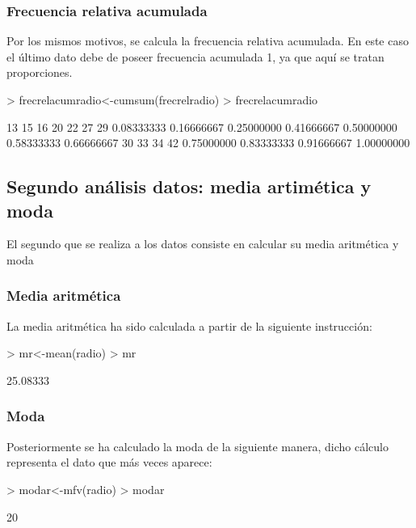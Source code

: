 \documentclass [a4paper] {article}
\begin{document}
\subsubsection{Frecuencia relativa acumulada}
Por los mismos motivos, se calcula la frecuencia relativa acumulada. En este caso el último dato debe de poseer frecuencia
acumulada 1, ya que aquí se tratan proporciones.

\begin{Schunk}
\begin{Sinput}
> frecrelacumradio<-cumsum(frecrelradio)
> frecrelacumradio
\end{Sinput}
\begin{Soutput}
        13         15         16         20         22         27         29 
0.08333333 0.16666667 0.25000000 0.41666667 0.50000000 0.58333333 0.66666667 
        30         33         34         42 
0.75000000 0.83333333 0.91666667 1.00000000 
\end{Soutput}
\end{Schunk}

\subsection{Segundo análisis datos: media artimética y moda}
El segundo que se realiza a los datos consiste en calcular su media aritmética y moda
\subsubsection{Media aritmética}
La media aritmética ha sido calculada a partir de la siguiente instrucción:
\begin{Schunk}
\begin{Sinput}
> mr<-mean(radio)
> mr
\end{Sinput}
\begin{Soutput}
[1] 25.08333
\end{Soutput}
\end{Schunk}
\subsubsection{Moda}
Posteriormente se ha calculado la moda de la siguiente manera, dicho 
cálculo representa el dato que más veces aparece:
\begin{Schunk}
\begin{Sinput}
> modar<-mfv(radio)
> modar
\end{Sinput}
\begin{Soutput}
[1] 20
\end{Soutput}
\end{Schunk}
\end{document}
